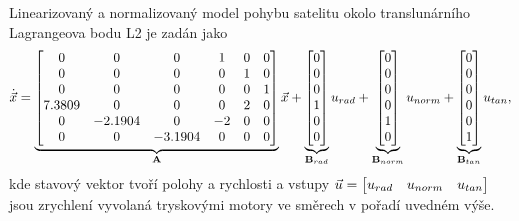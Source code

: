 \documentclass[twoside]{article}
\begin{document}
Linearizovaný a normalizovaný model pohybu satelitu okolo translunárního Lagrangeova bodu L2 je zadán jako
\begin{equation*}
	\dot{\vec{x}} = \underbrace{\begin{bmatrix}
		0 & 0 & 0 & 1 & 0 & 0\\
		0 & 0 & 0 & 0 & 1 & 0\\
		0 & 0 & 0 & 0 & 0 & 1\\
		7.3809 & 0 & 0 & 0 & 2 & 0\\
		0 & -2.1904 & 0 & -2 & 0 & 0\\
		0 & 0 & -3.1904 & 0 & 0 & 0
	\end{bmatrix}}_{\mathbf{A}} \vec{x} +  \underbrace{\begin{bmatrix}
		0\\
		0\\
		0\\
		1\\
		0\\
		0
	\end{bmatrix}}_{\mathbf{B}_{rad}} u_{rad} +  \underbrace{\begin{bmatrix}
		0\\
		0\\
		0\\
		0\\
		1\\
		0
	\end{bmatrix}}_{\mathbf{B}_{norm}} u_{norm} + \underbrace{
\begin{bmatrix}
		0\\
		0\\
		0\\
		0\\
		0\\
		1
	\end{bmatrix}}_{\mathbf{B}_{tan}} u_{tan},
\end{equation*}
kde stavový vektor tvoří polohy a rychlosti a vstupy $\vec{u} = \begin{bmatrix}
	u_{rad} & u_{norm} & u_{tan}
\end{bmatrix}$ jsou zrychlení vyvolaná tryskovými motory
ve směrech v pořadí uvedném výše.
\end{document}
